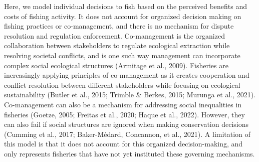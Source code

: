 \documentclass[
  12pt,
]{article}
\begin{document}
Here, we model individual decisions to fish based on the perceived benefits and costs of fishing activity. It does not account for organized decision making on fishing practices or co-management, and there is no mechanism for dispute resolution and regulation enforcement. Co-management is the organized collaboration between stakeholders to regulate ecological extraction while resolving societal conflicts, and is one such way management can incorporate complex social ecological structures (Armitage et al., 2009). Fisheries are increasingly applying principles of co-management as it creates cooperation and conflict resolution between different stakeholders while focusing on ecological sustainability (Butler et al., 2015; Trimble \& Berkes, 2015; Murunga et al., 2021). Co-management can also be a mechanism for addressing social inequalities in fisheries (Goetze, 2005; Freitas et al., 2020; Haque et al., 2022). However, they can also fail if social structures are ignored when making conservation decisions (Cumming et al., 2017; Baker-Médard, Concannon, et al., 2021). A limitation of this model is that it does not account for this organized decision-making, and only represents fisheries that have not yet instituted these governing mechanisms.
\end{document}
